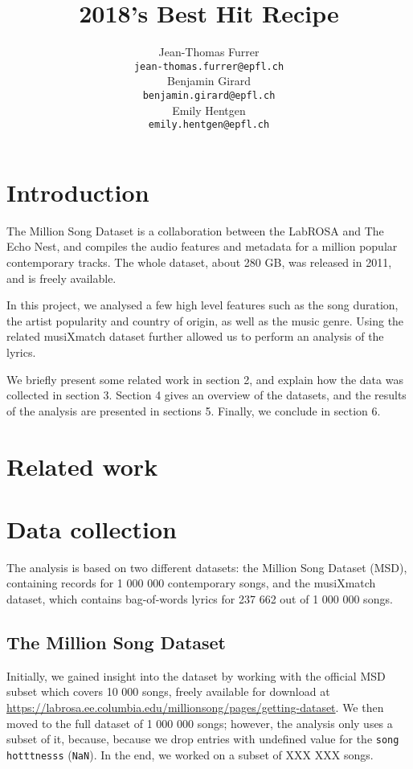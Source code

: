 \documentclass[11pt]{article}
\title{2018's Best Hit Recipe}
\author{Jean-Thomas Furrer \\
  {\small\tt jean-thomas.furrer@epfl.ch} \\\And
  Benjamin Girard \\
  {\small\tt benjamin.girard@epfl.ch} \\\And
  Emily Hentgen \\
{\small\tt emily.hentgen@epfl.ch} \\}
\date{}
\renewcommand\_{\textunderscore\allowbreak}
\begin{document}
\maketitle
\begin{abstract}
\end{abstract}


\section{Introduction}
The Million Song Dataset is a collaboration between the LabROSA and The Echo Nest, and compiles the audio features and metadata for a million popular contemporary tracks. The whole dataset, about 280 GB, was released in 2011, and is freely available. 

In this project, we analysed a few high level features such as the song duration, the artist popularity and country of origin, as well as the music genre. 
Using the related musiXmatch dataset further allowed us to perform an analysis of the lyrics.

We briefly present some related work in section 2, and explain how the data was collected in section 3. Section 4 gives an overview of the datasets, and the results of the analysis are presented in sections 5. Finally, we conclude in section 6.

\section{Related work}

\section{Data collection}
The analysis is based on two different datasets: the Million Song Dataset (MSD), containing records for 1 000 000 contemporary songs, and the musiXmatch dataset, which contains bag-of-words lyrics for 237 662 out of 1 000 000 songs.

\subsection{The Million Song Dataset}
Initially, we gained insight into the dataset by working with the official MSD subset which covers 10 000 songs, freely available for download at \url{https://labrosa.ee.columbia.edu/millionsong/pages/getting-dataset}.
We then moved to the full dataset of 1 000 000 songs; however, the analysis only uses a subset of it, because, because we drop entries with undefined value for the \texttt{song hotttnesss} (\texttt{NaN}).
In the end, we worked on a subset of XXX XXX songs.
\end{document}
